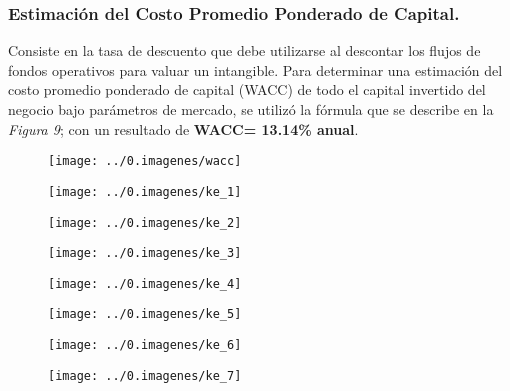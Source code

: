 \begin{leftcolumn}
\subsubsection{Estimación del Costo Promedio Ponderado de Capital.}

 Consiste en la tasa de descuento que debe utilizarse al descontar los flujos de fondos operativos para valuar un intangible. Para determinar una estimación del costo promedio ponderado de capital (WACC) de todo el capital invertido del negocio bajo parámetros de mercado, se utilizó la fórmula que se describe en la \textcolor{principal}{\textit{Figura 9}}; con un resultado de \textbf{WACC= 13.14\% anual}.\\ 

\begin{figure}[H]
\centering
\texttt{[image: ../0.imagenes/wacc]}
\end{figure}

\end{leftcolumn}


\begin{rightcolumn}
\begin{figure}[H]
\centering
\texttt{[image: ../0.imagenes/ke\_1]}
\end{figure}

\begin{figure}[H]
\centering
\texttt{[image: ../0.imagenes/ke\_2]}
\end{figure}

\begin{figure}[H]
\centering
\texttt{[image: ../0.imagenes/ke\_3]}
\end{figure}

\begin{figure}[H]
\centering
\texttt{[image: ../0.imagenes/ke\_4]}
\end{figure}

\begin{figure}[H]
\centering
\texttt{[image: ../0.imagenes/ke\_5]}
\end{figure}

\begin{figure}[H]
\centering
\texttt{[image: ../0.imagenes/ke\_6]}
\end{figure}

\begin{figure}[H]
\centering
\texttt{[image: ../0.imagenes/ke\_7]}
\end{figure}

\end{rightcolumn}